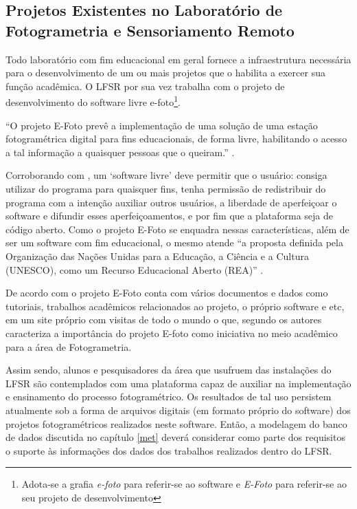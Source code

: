 \subsection{Projetos Existentes no Laboratório de Fotogrametria e Sensoriamento Remoto}\label{efoto}

Todo laboratório com fim educacional em geral fornece a infraestrutura necessária para o desenvolvimento de um ou mais projetos que o habilita a exercer sua função acadêmica. O LFSR por sua vez trabalha com o projeto de desenvolvimento do software livre e-foto\footnote{Adota-se a grafia \textit{e-foto} para referir-se ao software e \textit{E-Foto} para referir-se ao seu projeto de desenvolvimento}.

``O projeto E-Foto prevê a implementação de uma solução de uma estação fotogramétrica digital para fins educacionais, de forma livre, habilitando o acesso a tal informação a quaisquer pessoas que o queiram.'' \cite[p. 9]{coelho2007fotogrametria}.

Corroborando com , um `software livre' deve permitir que o usuário: consiga utilizar do programa para quaisquer fins, tenha permissão de redistribuir do programa com a intenção auxiliar outros usuários, a liberdade de aperfeiçoar o software e difundir esses aperfeiçoamentos, e por fim que a plataforma seja de código aberto. Como o projeto E-Foto se enquadra nessas características, além de ser um software com fim educacional, o mesmo atende ``a proposta definida pela Organização das Nações Unidas para a Educação, a Ciência e a Cultura (UNESCO), como um Recurso Educacional Aberto (REA)'' \cite[p.1032]{tramontina69analise}.

De acordo com  o projeto E-Foto conta com vários documentos e dados como tutoriais, trabalhos acadêmicos relacionados ao projeto, o próprio software e etc, em um site próprio com visitas de todo o mundo o que, segundo os autores caracteriza a importância do projeto E-foto como iniciativa no meio acadêmico para a área de Fotogrametria. 

Assim sendo, alunos e pesquisadores da área que usufruem das instalações do LFSR são contemplados com uma plataforma capaz de auxiliar na implementação e ensinamento do processo fotogramétrico. Os resultados de tal uso persistem atualmente sob a forma de arquivos digitais (em formato próprio do software) dos projetos fotogramétricos realizados neste software. Então, a modelagem do banco de dados discutida no capítulo \ref{met} deverá considerar como parte dos requisitos o suporte às informações dos dados dos trabalhos realizados dentro do LFSR. 

